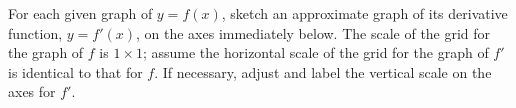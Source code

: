 \begin{activity} \label{A:1.4.1}
For each given graph of $y = f(x)$, sketch an approximate graph of its derivative function, $y = f'(x)$, on the axes immediately below.  The scale of the grid for the graph of $f$ is $1 \times 1$; assume the horizontal scale of the grid for the graph of $f'$ is identical to that for $f$.  If necessary, adjust and label the vertical scale on the axes for  $f'$.

\begin{center}

\vfill \ \pagebreak


\end{center}
\end{activity}
